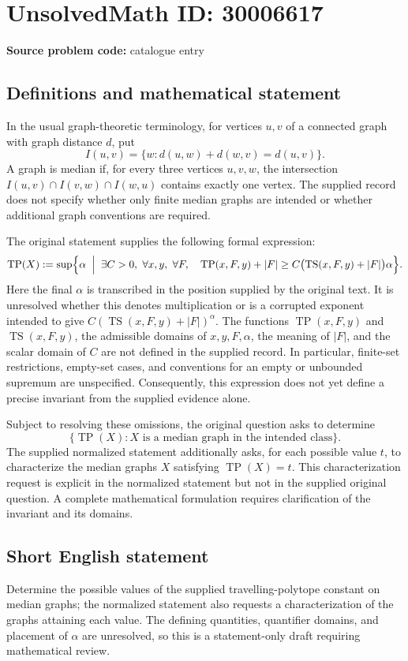 \documentclass[11pt]{article}
\begin{document}
\section*{UnsolvedMath ID: 30006617}
\textbf{Source problem code:} catalogue entry
\subsection{Definitions and mathematical statement}
In the usual graph-theoretic terminology, for vertices \(u,v\) of a connected graph with graph distance \(d\), put
\[
I(u,v)=\{w:d(u,w)+d(w,v)=d(u,v)\}.
\]
A graph is median if, for every three vertices \(u,v,w\), the intersection \(I(u,v)\cap I(v,w)\cap I(w,u)\) contains exactly one vertex. The supplied record does not specify whether only finite median graphs are intended or whether additional graph conventions are required.

The original statement supplies the following formal expression:
\[
\operatorname{TP}(X):=\sup\Bigl\{\alpha\;\Bigm|\;
\exists C>0,\ \forall x,y,\ \forall F,\quad
\operatorname{TP}(x,F,y)+|F|
\geq C\bigl(\operatorname{TS}(x,F,y)+|F|\bigr)\alpha
\Bigr\}.
\]
Here the final \(\alpha\) is transcribed in the position supplied by the original text. It is unresolved whether this denotes multiplication or is a corrupted exponent intended to give \(C(\operatorname{TS}(x,F,y)+|F|)^\alpha\). The functions \(\operatorname{TP}(x,F,y)\) and \(\operatorname{TS}(x,F,y)\), the admissible domains of \(x,y,F,\alpha\), the meaning of \(|F|\), and the scalar domain of \(C\) are not defined in the supplied record. In particular, finite-set restrictions, empty-set cases, and conventions for an empty or unbounded supremum are unspecified. Consequently, this expression does not yet define a precise invariant from the supplied evidence alone.

Subject to resolving these omissions, the original question asks to determine
\[
\{\operatorname{TP}(X):X\text{ is a median graph in the intended class}\}.
\]
The supplied normalized statement additionally asks, for each possible value \(t\), to characterize the median graphs \(X\) satisfying \(\operatorname{TP}(X)=t\). This characterization request is explicit in the normalized statement but not in the supplied original question. A complete mathematical formulation requires clarification of the invariant and its domains.
\subsection{Short English statement}
Determine the possible values of the supplied travelling-polytope constant on median graphs; the normalized statement also requests a characterization of the graphs attaining each value. The defining quantities, quantifier domains, and placement of \(\alpha\) are unresolved, so this is a statement-only draft requiring mathematical review.
\end{document}
